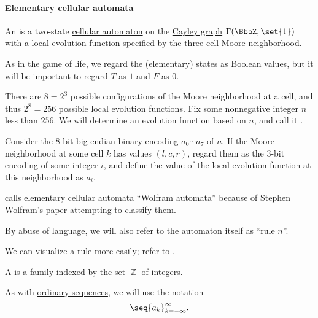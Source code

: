 \paragraph{Elementary cellular automata}

\begin{definition}\label{def:elementary_cellular_automaton}
  An  is a two-state \hyperref[def:cellular_automaton]{cellular automaton} on the \hyperref[def:cayley_graph]{Cayley graph} \( \Gamma(\BbbZ, \set{ 1 }) \) with a local evolution function specified by the three-cell \hyperref[def:cayley_graph_neighborhood/moore]{Moore neighborhood}.

  As in the \hyperref[def:game_of_life]{game of life}, we regard the (elementary) states as \hyperref[con:boolean_value]{Boolean values}, but it will be important to regard \( T \) as \( 1 \) and \( F \) as \( 0 \).

  There are \( 8 = 2^3 \) possible configurations of the Moore neighborhood at a cell, and thus \( 2^8 = 256 \) possible local evolution functions. Fix some nonnegative integer \( n \) less than \( 256 \). We will determine an evolution function based on \( n \), and call it .

  Consider the \( 8 \)-bit \hyperref[def:endianness/big]{big endian} \hyperref[def:ring_of_unsigned_integers]{binary encoding} \( a_0 \cdots a_7 \) of \( n \). If the Moore neighborhood at some cell \( k \) has values \( (l, c, r) \), regard them as the \( 3 \)-bit encoding of some integer \( i \), and define the value of the local evolution function at this neighborhood as \( a_i \).
\end{definition}
\begin{comments}
  \item {} calls elementary cellular automata \enquote{Wolfram automata} because of Stephen Wolfram's paper \cite{Wolfram1983StatisticalMechanicsOfCellularAutomata} attempting to classify them.

  \item By abuse of language, we will also refer to the automaton itself as \enquote{rule \( n \)}.

  \item We can visualize a rule more easily; refer to .
\end{comments}

\begin{definition}\label{def:doubly_infinite_sequence}
  A  is a \hyperref[def:indexed_family]{family} indexed by the set \( \BbbZ \) of \hyperref[def:integers]{integers}.

  As with \hyperref[def:sequence]{ordinary sequences}, we will use the notation
  \begin{equation*}
    \seq{ a_k }_{k=-\infty}^\infty.
  \end{equation*}
\end{definition}

